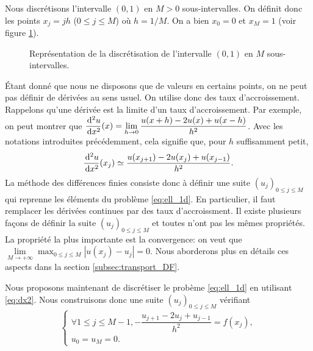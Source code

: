 \documentclass[12pt,a4paper,twoside]{article}
\begin{document}
Nous discr\'etisons l'intervalle $(0,1)$ en $M>0$ sous-intervalles.
On d\'efinit donc les points $x_j = j h$ ($0 \leq j \leq M$) o\`u $h = 1/M$.
On a bien $x_0 = 0$ et $x_M = 1$ (voir figure \ref{fig:disc_x}).

\begin{figure}
\centering
{} 
\caption{Repr\'esentation de la discr\'etisation de l'intervalle $(0,1)$ en $M$ sous-intervalles.}
\label{fig:disc_x}
\end{figure}


\'Etant donn\'e que nous ne disposons que de valeurs en certains points, on ne peut
pas d\'efinir de d\'eriv\'ees au sens usuel. On utilise donc des taux d'accroissement.
Rappelons qu'une d\'eriv\'ee est la limite d'un taux d'accroissement.
Par exemple, on peut montrer que 
$\dfrac{\!\;\mathrm{d}^2 u}{\!\;\mathrm{d} x^2}(x) 
= \lim\limits_{h \to 0} \dfrac{u(x+h) - 2 u(x) + u(x-h)}{h^2}$.
Avec les notations introduites pr\'ec\'edemment, cela signifie que,
pour $h$ suffisamment petit, 
\begin{align}
  \label{eq:dx2}
  \dfrac{\!\;\mathrm{d}^2 u}{\!\;\mathrm{d} x^2}(x_j) \simeq \dfrac{u(x_{j+1}) - 2 u(x_j) + u(x_{j-1})}{h^2} .
\end{align}
La m\'ethode des diff\'erences finies consiste donc \`a d\'efinir une suite $(u_j)_{0\leq j \leq M}$
qui reprenne les \'el\'ements du probl\`eme \eqref{eq:ell_1d}. En particulier, il faut remplacer
les d\'eriv\'ees continues par des taux d'accroissment.
Il existe plusieurs fa\c{c}ons de d\'efinir la suite $(u_j)_{0\leq j \leq M}$ et toutes
n'ont pas les m\^emes propri\'et\'es. La propri\'et\'e la plus importante est la convergence:
on veut que $\lim\limits_{M \to +\infty} \max_{0 \leq j \leq M} | u(x_j) - u_j | = 0$.
Nous aborderons plus en d\'etails ces aspects dans la section \ref{subsec:transport_DF}.


Nous proposons maintenant de discr\'etiser le prob\`eme \eqref{eq:ell_1d}
en utilisant \eqref{eq:dx2}.
Nous construisons donc une suite $(u_j)_{0\leq j \leq M}$ v\'erifiant
\begin{equation}
  \label{eq:ell_DF}
  \left\{
    \begin{array}{l}
      \forall 1 \leq j \leq M-1 , - \dfrac{u_{j+1} - 2 u_j + u_{j-1}}{h^2} = f(x_j) ,
      \\
      u_0 = u_M = 0 .
    \end{array}
  \right.
\end{equation}
\end{document}
